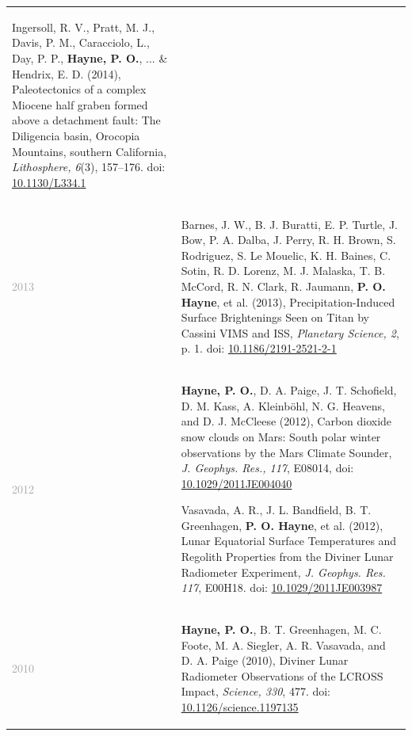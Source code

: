 \documentclass[letterpaper,10pt,twoside]{article}
\begin{document}
\begin{longtable}{@{} p{} p{}}
\begin{enumerate} [leftmargin=!,labelindent=2.5pt,itemindent=-10pt]
{            \item Ingersoll, R. V., Pratt, M. J., Davis, P. M., Caracciolo, L., Day, P. P., {\bf Hayne, P. O.}, ... \& Hendrix, E. D. (2014), Paleotectonics of a complex Miocene half graben formed above a detachment fault: The Diligencia basin, Orocopia Mountains, southern California, {\it Lithosphere, 6}(3), 157--176. doi: \href{https://doi.org/10.1130/L334.1}{10.1130/L334.1}
            }
            \end{enumerate} \\
            
    \textcolor{darkgray}{2013}    & \begin{enumerate} [leftmargin=!,labelindent=2.5pt,itemindent=-10pt]\setcounter{enumi}{98}
            {\small
            \item Barnes, J. W., B. J. Buratti, E. P. Turtle, J. Bow, P. A. Dalba, J. Perry, R. H. Brown, S. Rodriguez, S. Le Mouelic, K. H. Baines, C. Sotin, R. D. Lorenz, M. J. Malaska, T. B. McCord, R. N. Clark, R. Jaumann, {\bf P. O. Hayne}, et al. (2013), Precipitation-Induced Surface Brightenings Seen on Titan by Cassini VIMS and ISS, {\it Planetary Science, 2}, p. 1. doi: \href{https://doi.org/10.1186/2191-2521-2-1}{10.1186/2191-2521-2-1}
            }
            \end{enumerate} \\

    \textcolor{darkgray}{2012}    & \begin{enumerate} [leftmargin=!,labelindent=2.5pt,itemindent=-10pt]\setcounter{enumi}{99}
            {\small
            \item {\bf Hayne, P. O.}, D. A. Paige, J. T. Schofield, D. M. Kass, A. Kleinb{\"o}hl, N. G. Heavens, and D. J. McCleese (2012), Carbon dioxide snow clouds on Mars: South polar winter observations by the Mars Climate Sounder, {\it J. Geophys. Res., 117}, E08014, doi: \href{https://doi.org/10.1029/2011JE004040}{10.1029/2011JE004040}
    
            \item Vasavada, A. R., J. L. Bandfield, B. T. Greenhagen, {\bf P. O. Hayne}, et al. (2012), Lunar Equatorial Surface Temperatures and Regolith Properties from the Diviner Lunar Radiometer Experiment, {\it J. Geophys. Res. 117}, E00H18. doi: \href{https://doi.org/10.1029/2011JE003987}{10.1029/2011JE003987}
            }
            \end{enumerate} \\
            
    \textcolor{darkgray}{2010}    & \begin{enumerate} [leftmargin=!,labelindent=2.5pt,itemindent=-10pt]\setcounter{enumi}{101}
            {\small
            \item {\bf Hayne, P. O.}, B. T. Greenhagen, M. C. Foote, M. A. Siegler, A. R. Vasavada, and D. A. Paige (2010), Diviner Lunar Radiometer Observations of the LCROSS Impact, {\it Science, 330}, 477. doi: \href{https://doi.org/10.1126/science.1197135}{10.1126/science.1197135}
    
}
\end{enumerate}
\end{longtable}
\end{document}
